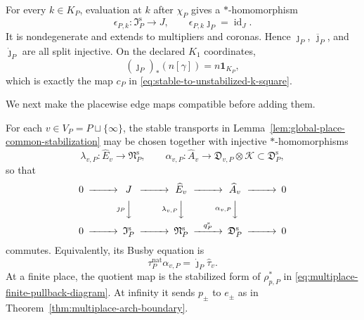 For every $k\in K_P$, evaluation at $k$ after $\chi_P$ gives a
$*$-homomorphism
\[
 \epsilon_{P,k}:\mathfrak I_P^{\mathrm s}\longrightarrow J,
 \qquad \epsilon_{P,k}\jmath_P=\operatorname{id}_J.
\]
It is nondegenerate and extends to multipliers and coronas.  Hence
$\jmath_P$, $\overline\jmath_P$, and $\dot\jmath_P$ are all split
injective.  On the declared $K_1$ coordinates,
\begin{equation}
 (\jmath_P)_*(n[\gamma])
 =n\mathbf1_{K_P},
 \label{eq:constant-unit-fibre-K1-map}
\end{equation}
which is exactly the map $c_P$ in
\eqref{eq:stable-to-unstabilized-k-square}.

We next make the placewise edge maps compatible before adding them.

\begin{lemma}
\label{lem:compatible-stabilized-edge-morphisms}
For each $v\in V_P=P\sqcup\{\infty\}$, the stable transports in
Lemma~\ref{lem:global-place-common-stabilization} may be chosen together with
injective $*$-homomorphisms
\[
 \lambda_{v,P}:\widehat E_v\longrightarrow\mathfrak N_P^{\mathrm s},
 \qquad
 \alpha_{v,P}:\widehat A_v\longrightarrow
 \mathfrak D_{v,P}\otimes\mathcal K
 \subset\mathfrak D_P^{\mathrm s},
\]
so that
\begin{equation}
\begin{CD}
0@>>>J@>>>\widehat E_v@>>>\widehat A_v@>>>0\\
@.@V{\jmath_P}VV@V{\lambda_{v,P}}VV@V{\alpha_{v,P}}VV@.\\
0@>>>\mathfrak I_P^{\mathrm s}
 @>>>\mathfrak N_P^{\mathrm s}
 @>{q_P^{\mathrm s}}>>\mathfrak D_P^{\mathrm s}@>>>0
\end{CD}
\label{eq:compatible-stabilized-edge-morphism}
\end{equation}
commutes.  Equivalently, its Busby equation is
\begin{equation}
 \tau_P^{\mathrm{nat}}\alpha_{v,P}
 =\dot\jmath_P\widehat\tau_v.
 \label{eq:placewise-natural-busby-equation}
\end{equation}
At a finite place, the quotient map is the stabilized form of
$\rho_{p,P}^*$ in
\eqref{eq:multiplace-finite-pullback-diagram}.  At infinity it sends
$p_\pm$ to $e_\pm$ as in
Theorem~\ref{thm:multiplace-arch-boundary}.
\end{lemma}


